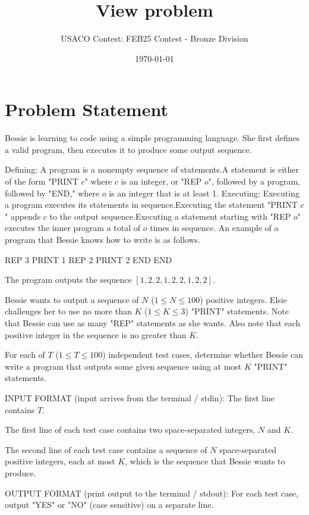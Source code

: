 \documentclass[12pt]{article}
\title{View problem}
\author{USACO Contest: FEB25 Contest - Bronze Division}
\date{\today}
\begin{document}
\maketitle

\section*{Problem Statement}


Bessie is learning to code using a simple programming language. She first
defines a valid program, then executes it to produce some output sequence. 

Defining:
A program is a nonempty sequence of statements.A
statement is either of the form "PRINT $c$" where $c$ is an integer, or "REP
$o$",  followed by a program, followed by "END," where $o$ is an integer that is
at least 1.
Executing:
Executing a program executes its statements in sequence.Executing
the statement "PRINT $c$" appends $c$ to the output sequence.Executing
a statement starting with "REP $o$" executes the inner program a total of $o$
times in sequence.
An example of a program that Bessie knows how to write is as follows.


REP 3
    PRINT 1
    REP 2
        PRINT 2
    END
END

The program outputs the sequence $[1,2,2,1,2,2,1,2,2]$.

Bessie wants to output a sequence of $N$ ($1 \le N \le 100$) positive integers.
Elsie challenges her to use no more than $K$ ($1 \le K \le 3$) "PRINT"
statements. Note that Bessie can use as many "REP" statements as she wants. Also
note that each positive integer in the sequence is no greater than $K$.

For each of $T$ ($1 \le T \le 100$) independent test cases, determine whether
Bessie can write a program that outputs some given sequence using at most $K$
"PRINT" statements.

INPUT FORMAT (input arrives from the terminal / stdin):
The first line contains $T$.

The first line of each test case contains two space-separated integers, $N$ and
$K$.

The second line of each test case contains a sequence of $N$ space-separated
positive integers,  each at most $K$, which is the sequence that Bessie wants to
produce.

OUTPUT FORMAT (print output to the terminal / stdout):
For each test case, output "YES" or "NO" (case sensitive) on a separate line.
\end{document}
